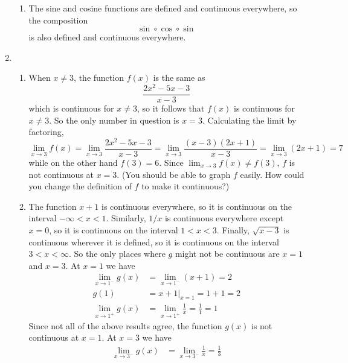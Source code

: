 \documentclass{article}
\newcommand{\ds}{\displaystyle}
\begin{document}
\begin{enumerate}
\begin{enumerate}
  \item %
    The sine and cosine functions are defined and continuous
    everywhere, so the composition
    \begin{equation*}
      \sin\circ \cos \circ \sin
    \end{equation*}
    is also defined and continuous everywhere.
  \end{enumerate}
\item %
  \begin{enumerate}
  \item %
    When $x\ne 3$, the function $f(x)$ is the same as 
    \begin{equation*}
      \frac{2x^2-5x-3}{x-3}
    \end{equation*}
    which is continuous for $x\ne 3$, so it follows that $f(x)$ is
    continuous for $x\ne 3$.  So the only number in question is $x=3$.
    Calculating the limit by factoring,
    \begin{equation*}
      \lim_{x\to 3} f(x) = \lim_{x\to 3} \frac{2x^2-5x-3}{x-3}
      = \lim_{x\to 3} \frac{(x-3)(2x+1)}{x-3}
      = \lim_{x\to 3} (2x+1) = 7
    \end{equation*}
    while on the other hand $f(3)=6$.  Since
    $\ds \lim_{x\to 3} f(x)\ne f(3)$, $f$ is not continuous at $x=3$.
    (You should be able to graph $f$ easily.  How could you change the
    definition of $f$ to make it continuous?)
  \item %
    The function $x+1$ is continuous everywhere, so it is continuous
    on the interval $-\infty< x< 1$.  Similarly, $1/x$ is continuous
    everywhere except $x=0$, so it is continuous on the interval
    $1<x<3$.  Finally, $\sqrt{x-3}$ is continuous wherever it is
    defined, so it is continuous on the interval $3< x<\infty$.  So
    the only places where $g$ might not be continuous are $x=1$ and
    $x=3$.  At $x=1$ we have
    \begin{align*}
      \lim_{x\to 1^-} g(x) &= \lim_{x\to 1^-} (x+1) = 2 \\
      g(1) &= \left. x+1 \right|_{x=1} = 1+1 = 2 \\
      \lim_{x\to 1^+} g(x) &= \lim_{x\to 1^+} \frac{1}{x} = \frac{1}{1} = 1
    \end{align*}
    Since not all of the above results agree, the function $g(x)$ is
    not continuous at $x=1$.  At $x=3$ we have
    \begin{align*}
      \lim_{x\to 3^-} g(x) &= \lim_{x\to 3^-} \frac{1}{x} = \frac{1}{3} \\

\end{align*}
\end{enumerate}
\end{enumerate}
\end{document}
